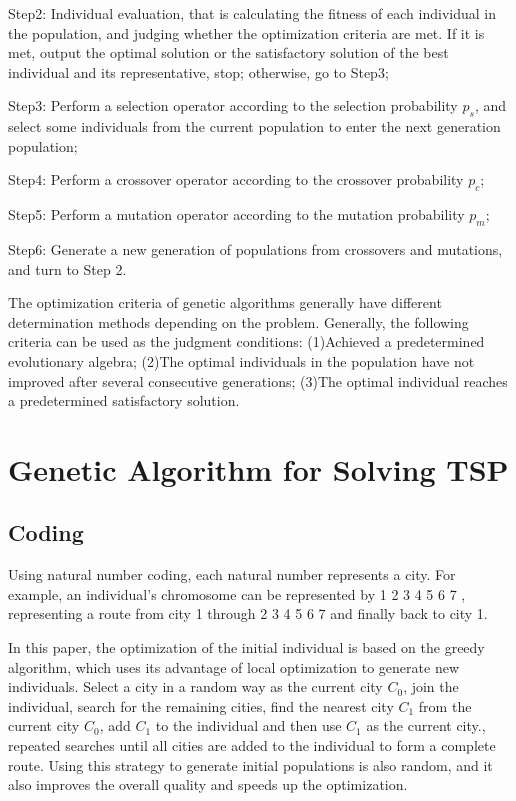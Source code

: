 \documentclass[12pt]{article}
\begin{document}
Step2: Individual evaluation, that is calculating the fitness of each individual in the population, and judging whether the optimization criteria are met.
If it is met, output the optimal solution or the satisfactory solution of the best individual and its representative, stop; otherwise, go to Step3;

Step3: Perform a selection operator according to the selection probability $p_s$, and select some individuals from the current population to enter the next generation population;

Step4: Perform a crossover operator according to the crossover probability $p_c$;

Step5: Perform a mutation operator according to the mutation probability $p_m$;

Step6: Generate a new generation of populations from crossovers and mutations, and turn to Step 2.

The optimization criteria of genetic algorithms generally have different determination methods depending on the problem. Generally, the following criteria can be used as the judgment conditions:
(1)Achieved a predetermined evolutionary algebra;
(2)The optimal individuals in the population have not improved after several consecutive generations;
(3)The optimal individual reaches a predetermined satisfactory solution.

\section{Genetic Algorithm for Solving TSP}
\subsection{Coding}
Using natural number coding, each natural number represents a city. For example, an individual's chromosome can be represented by 1 2 3 4 5 6 7 , representing a route from city 1 through 2 3 4 5 6 7 and finally back to city 1.

In this paper, the optimization of the initial individual is based on the greedy algorithm, 
which uses its advantage of local optimization to generate new individuals. 
Select a city in a random way as the current city $C_0$, join the individual, search for the remaining cities, find the nearest city $C_1$ from the current city $C_0$, add $C_1$ to the individual and then use $C_1$ as the current city., 
repeated searches until all cities are added to the individual to form a complete route. Using this strategy to generate initial populations is also random, and it also improves the overall quality and speeds up the optimization.
\end{document}
